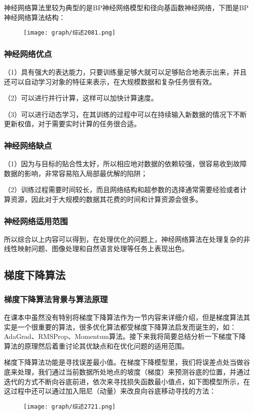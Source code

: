 \documentclass{cjc}
\begin{document}
神经网络算法里较为典型的是BP神经网络模型和径向基函数神经网络，下图是BP神经网络算法结构：
\begin{figure}
  \centering
  \texttt{[image: graph/综述2081.png]}
\end{figure}


\subsubsection{神经网络优点}
（1）具有强大的表达能力，只要训练量足够大就可以足够贴合地表示出来，并且还可以自动学习对象的特征来表示，在大规模数据和复杂任务很有效。

（2）可以进行并行计算，这样可以加快计算速度。

（3）可以进行动态学习，在其训练的过程中可以在持续输入新数据的情况下不断更新权值，对于需要实时计算的任务很合适。

\subsubsection{神经网络缺点}
（1）因为与目标的贴合性太好，所以相应地对数据的依赖较强，很容易收到故障数据的影响，非常容易陷入局部最优解的陷阱；

（2）训练过程需要时间较长，而且网络结构和超参数的选择通常需要经验或者计算资源，因此对于大规模的数据其花费的时间和计算资源会很多。

\subsubsection{神经网络适用范围}
所以综合以上内容可以得到，在处理优化的问题上，神经网络算法在处理复杂的非线性映射问题、图像处理和自然语言处理等任务上表现出色。

\subsection{梯度下降算法}
\subsubsection{梯度下降算法背景与算法原理}
在课本中虽然没有特别将梯度下降算法作为一节内容来详细介绍，但是梯度算法其实是一个很重要的算法，很多优化算法都受梯度下降算法启发而诞生的，如：AdaGrad、RMSProp、Momentum算法。接下来我将简要总结分析一下梯度下降算法的原理然后着重讨论其优缺点和在优化问题的适用范围。

梯度下降算法功能是寻找误差最小值。在梯度下降模型里，我们将误差点处当做谷底来处理，我们通过当前数据所处地点的坡度（梯度）来预测谷底的位置，并通过迭代的方式不断向谷底前进，依次来寻找损失函数最小值点，如下图模型所示，在这过程中还可以通过加入阻尼（动量）来改良向谷底移动寻找的方法：
\begin{figure}
  \centering
  \texttt{[image: graph/综述2721.png]}
\end{figure}
\end{document}
